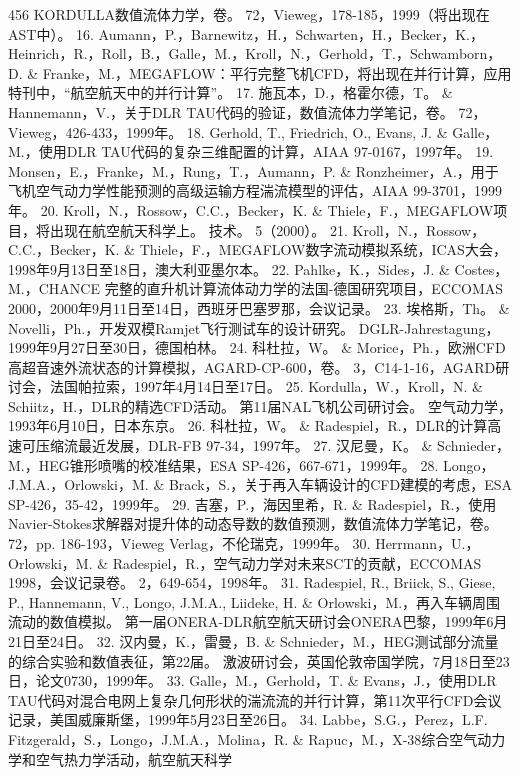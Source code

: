 \documentclass[UTF8,11pt,a4paper,openany,fontset=fandol]{ctexbook}
\begin{document}
456 KORDULLA数值流体力学，卷。 72，Vieweg，178-185，1999（将出现在AST中）。 16. Aumann，P.，Barnewitz，H.，Schwarten，H.，Becker，K.，Heinrich，R.，Roll，B.，Galle，M.，Kroll，N.，Gerhold，T.，Schwamborn，D. \& Franke，M.，MEGAFLOW：平行完整飞机CFD，将出现在并行计算，应用特刊中，“航空航天中的并行计算”。 17. 施瓦本，D.，格霍尔德，T。 \& Hannemann，V.，关于DLR TAU代码的验证，数值流体力学笔记，卷。 72，Vieweg，426-433，1999年。 18. Gerhold, T., Friedrich, O., Evans, J. \& Galle，M.，使用DLR TAU代码的复杂三维配置的计算，AIAA 97-0167，1997年。 19. Monsen，E.，Franke，M.，Rung，T.，Aumann，P. \& Ronzheimer，A.，用于飞机空气动力学性能预测的高级运输方程湍流模型的评估，AIAA 99-3701，1999年。 20. Kroll，N.，Rossow，C.C.，Becker，K. \& Thiele，F.，MEGAFLOW项目，将出现在航空航天科学上。 技术。 5（2000）。 21. Kroll，N.，Rossow，C.C.，Becker，K. \& Thiele，F.，MEGAFLOW数字流动模拟系统，ICAS大会，1998年9月13日至18日，澳大利亚墨尔本。 22. Pahlke，K.，Sides，J. \& Costes，M.，CHANCE 完整的直升机计算流体动力学的法国-德国研究项目，ECCOMAS 2000，2000年9月11日至14日，西班牙巴塞罗那，会议记录。 23. 埃格斯，Th。 \& Novelli，Ph.，开发双模Ramjet飞行测试车的设计研究。 DGLR-Jahrestagung，1999年9月27日至30日，德国柏林。 24. 科杜拉，W。 \& Morice，Ph.，欧洲CFD高超音速外流状态的计算模拟，AGARD-CP-600，卷。 3，C14-1-16，AGARD研讨会，法国帕拉索，1997年4月14日至17日。 25. Kordulla，W.，Kroll，N. \& Schiitz，H.，DLR的精选CFD活动。 第11届NAL飞机公司研讨会。 空气动力学，1993年6月10日，日本东京。 26. 科杜拉，W。 \& Radespiel，R.，DLR的计算高速可压缩流最近发展，DLR-FB 97-34，1997年。 27. 汉尼曼，K。 \& Schnieder，M.，HEG锥形喷嘴的校准结果，ESA SP-426，667-671，1999年。 28. Longo，J.M.A.，Orlowski，M. \& Brack，S.，关于再入车辆设计的CFD建模的考虑，ESA SP-426，35-42，1999年。 29. 吉塞，P.，海因里希，R. \& Radespiel，R.，使用Navier-Stokes求解器对提升体的动态导数的数值预测，数值流体力学笔记，卷。 72，pp. 186-193，Vieweg Verlag，不伦瑞克，1999年。 30. Herrmann，U.，Orlowski，M. \& Radespiel，R.，空气动力学对未来SCT的贡献，ECCOMAS 1998，会议记录卷。 2，649-654，1998年。 31. Radespiel, R., Briick, S., Giese, P., Hannemann, V., Longo, J.M.A., Liideke, H. \& Orlowski，M.，再入车辆周围流动的数值模拟。 第一届ONERA-DLR航空航天研讨会ONERA巴黎，1999年6月21日至24日。 32. 汉内曼，K.，雷曼，B. \& Schnieder，M.，HEG测试部分流量的综合实验和数值表征，第22届。 激波研讨会，英国伦敦帝国学院，7月18日至23日，论文0730，1999年。 33. Galle，M.，Gerhold，T. \& Evans，J.，使用DLR TAU代码对混合电网上复杂几何形状的湍流流的并行计算，第11次平行CFD会议记录，美国威廉斯堡，1999年5月23日至26日。 34. Labbe，S.G.，Perez，L.F. Fitzgerald，S.，Longo，J.M.A.，Molina，R. \& Rapuc，M.，X-38综合空气动力学和空气热力学活动，航空航天科学
\end{document}
